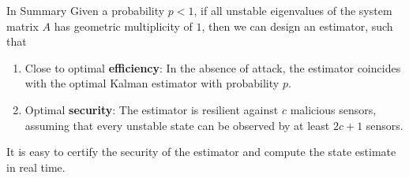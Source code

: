 \documentclass[10pt]{beamer}
\begin{document}
\begin{frame}{In Summary}
  Given a probability $p<1$, if all unstable eigenvalues of the system matrix $A$ has geometric multiplicity of $1$, then we can design an estimator, such that
  \begin{enumerate}
    \item Close to optimal {\bf efficiency}: In the absence of attack, the estimator coincides with the optimal Kalman estimator with probability $p$.
    \item Optimal {\bf security}: The estimator is resilient against $c$ malicious sensors, assuming that every unstable state can be observed by at least $2c+1$ sensors.
  \end{enumerate}
  It is easy to certify the security of the estimator and compute the state estimate in real time. 
\end{frame}
\end{document}
